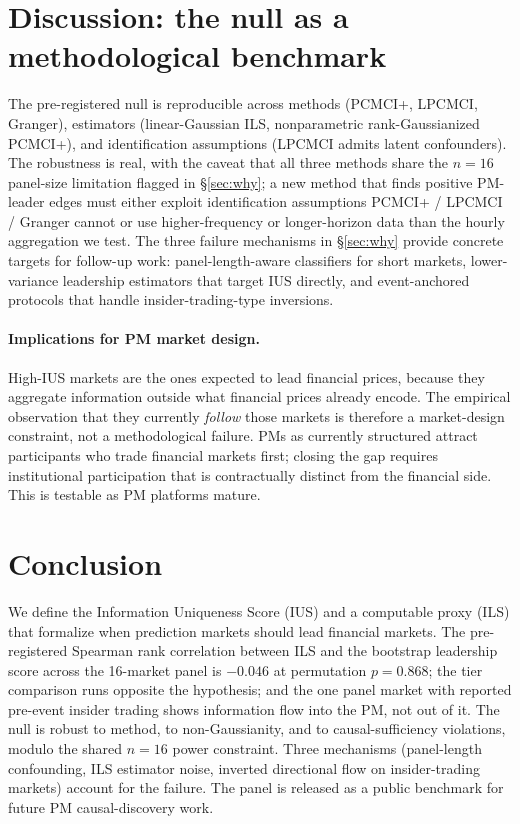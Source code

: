 \documentclass{article}
\begin{document}
\section{Discussion: the null as a methodological benchmark}
\label{sec:discussion}

The pre-registered null is reproducible across methods (PCMCI+, LPCMCI, Granger), estimators (linear-Gaussian ILS, nonparametric rank-Gaussianized PCMCI+), and identification assumptions (LPCMCI admits latent confounders). The robustness is real, with the caveat that all three methods share the $n = 16$ panel-size limitation flagged in \S\ref{sec:why}; a new method that finds positive PM-leader edges must either exploit identification assumptions PCMCI+ / LPCMCI / Granger cannot or use higher-frequency or longer-horizon data than the hourly aggregation we test. The three failure mechanisms in \S\ref{sec:why} provide concrete targets for follow-up work: panel-length-aware classifiers for short markets, lower-variance leadership estimators that target IUS directly, and event-anchored protocols that handle insider-trading-type inversions.

\paragraph{Implications for PM market design.}
High-IUS markets are the ones expected to lead financial prices, because they aggregate information outside what financial prices already encode. The empirical observation that they currently \emph{follow} those markets is therefore a market-design constraint, not a methodological failure. PMs as currently structured attract participants who trade financial markets first; closing the gap requires institutional participation that is contractually distinct from the financial side. This is testable as PM platforms mature.

\section{Conclusion}
\label{sec:conclusion}

We define the Information Uniqueness Score (IUS) and a computable proxy (ILS) that formalize when prediction markets should lead financial markets. The pre-registered Spearman rank correlation between ILS and the bootstrap leadership score across the 16-market panel is $-0.046$ at permutation $p = 0.868$; the tier comparison runs opposite the hypothesis; and the one panel market with reported pre-event insider trading shows information flow into the PM, not out of it. The null is robust to method, to non-Gaussianity, and to causal-sufficiency violations, modulo the shared $n = 16$ power constraint. Three mechanisms (panel-length confounding, ILS estimator noise, inverted directional flow on insider-trading markets) account for the failure. The panel is released as a public benchmark for future PM causal-discovery work.
\end{document}
